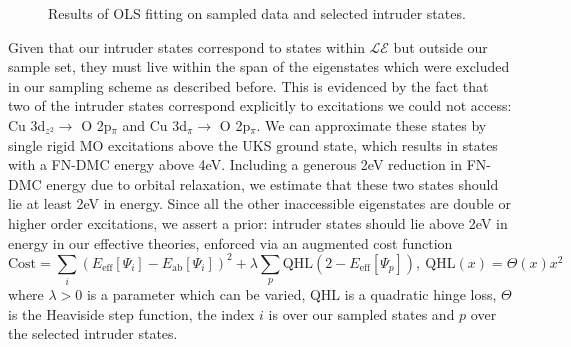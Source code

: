 \documentclass[12pt]{article}
\begin{document}
\begin{figure}[H]
	\centering
	\qquad
	\caption{Results of OLS fitting on sampled data and selected intruder states.}
\end{figure}

Given that our intruder states correspond to states within $\mathcal{LE}$ but outside our sample set, they must live within the span of the eigenstates which were excluded in our sampling scheme as described before.
This is evidenced by the fact that two of the intruder states correspond explicitly to excitations we could not access: Cu 3d$_{z^2} \rightarrow $ O 2p$_\pi$ and  Cu 3d$_\pi \rightarrow $ O 2p$_\pi$.
We can approximate these states by single rigid MO excitations above the UKS ground state, which results in states with a FN-DMC energy above 4eV.
Including a generous 2eV reduction in FN-DMC energy due to orbital relaxation, we estimate that these two states should lie at least 2eV in energy. 
Since all the other inaccessible eigenstates are double or higher order excitations, we assert a prior: intruder states should lie above 2eV in energy in our effective theories, enforced via an augmented cost function
\begin{equation}
\text{Cost} = \sum_{i} (E_\text{eff}[\Psi_i] - E_\text{ab}[\Psi_i])^2 + \lambda \sum_{p}\text{QHL}(2 - E_\text{eff}[\Psi_p]),\ \text{QHL}(x) = \Theta(x)x^2
\label{eq:cost}
\end{equation}
where $\lambda>0$ is a parameter which can be varied, QHL is a quadratic hinge loss, $\Theta$ is the Heaviside step function, the index $i$ is over our sampled states and $p$ over the selected intruder states.
\end{document}

